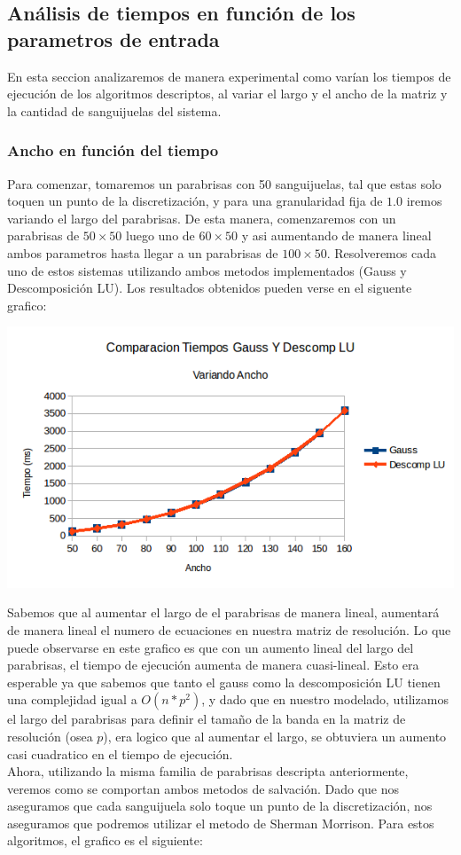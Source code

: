 \subsection{An\'alisis de tiempos en funci\'on de los parametros de entrada}
En esta seccion analizaremos de manera experimental como varían los tiempos de ejecución de los algoritmos descriptos, al variar el largo y el ancho de la matriz y la cantidad de sanguijuelas del sistema.
\subsubsection{Ancho en función del tiempo}
Para comenzar, tomaremos un parabrisas con 50 sanguijuelas, tal que estas solo toquen un punto de la discretización, y para una granularidad fija de $1.0$ iremos variando el largo del parabrisas. De esta manera, comenzaremos con un parabrisas de $50 \times 50$ luego uno de $60 \times 50$ y asi aumentando de manera lineal ambos parametros hasta llegar a un parabrisas de $100 \times 50$. Resolveremos cada uno de estos sistemas utilizando ambos metodos implementados (Gauss y Descomposición LU). Los resultados obtenidos pueden verse en el siguente grafico:

\begin{center}
 \includegraphics[width=400pt]{imagenes/testeo/anchoGauss.png}
\end{center}

Sabemos que al aumentar el largo de el parabrisas de manera lineal, aumentará de manera lineal el numero de ecuaciones en nuestra matriz de resolución. Lo que puede observarse en este grafico es que con un aumento lineal del largo del parabrisas, el tiempo de ejecución aumenta de manera cuasi-lineal. Esto era esperable ya que sabemos que tanto el gauss como la descomposición LU tienen una complejidad igual a $O(n*p^2)$, y dado que en nuestro modelado, utilizamos el largo del parabrisas para definir el tamaño de la banda en la matriz de resolución (osea $p$), era logico que al aumentar el largo, se obtuviera un aumento casi cuadratico en el tiempo de ejecución.
\\
Ahora, utilizando la misma familia de parabrisas descripta anteriormente, veremos como se comportan ambos metodos de salvación. Dado que nos aseguramos que cada sanguijuela solo toque un punto de la discretización, nos aseguramos que podremos utilizar el metodo de Sherman Morrison. Para estos algoritmos, el grafico es el siguiente:

